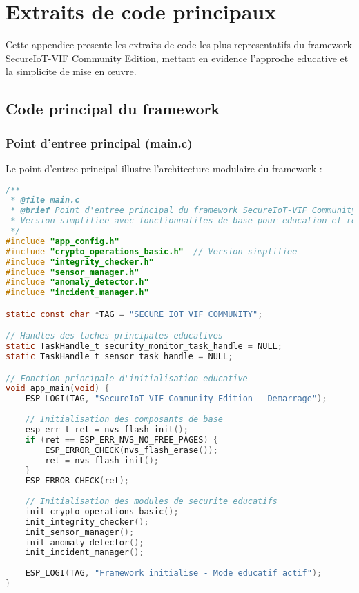 
\appendix

\chapter{Extraits de code principaux}
\label{app:code}

Cette appendice presente les extraits de code les plus representatifs du framework SecureIoT-VIF Community Edition, mettant en evidence l'approche educative et la simplicite de mise en œuvre.

\section{Code principal du framework}

\subsection{Point d'entree principal (main.c)}

Le point d'entree principal illustre l'architecture modulaire du framework :

\begin{lstlisting}[language=C, caption={Structure principale du framework - main.c}, label=lst:main-structure]
/**
 * @file main.c
 * @brief Point d'entree principal du framework SecureIoT-VIF Community Edition
 * Version simplifiee avec fonctionnalites de base pour education et recherche.
 */
#include "app_config.h"
#include "crypto_operations_basic.h"  // Version simplifiee
#include "integrity_checker.h"
#include "sensor_manager.h"
#include "anomaly_detector.h"
#include "incident_manager.h"

static const char *TAG = "SECURE_IOT_VIF_COMMUNITY";

// Handles des taches principales educatives
static TaskHandle_t security_monitor_task_handle = NULL;
static TaskHandle_t sensor_task_handle = NULL;

// Fonction principale d'initialisation educative
void app_main(void) {
    ESP_LOGI(TAG, "SecureIoT-VIF Community Edition - Demarrage");
    
    // Initialisation des composants de base
    esp_err_t ret = nvs_flash_init();
    if (ret == ESP_ERR_NVS_NO_FREE_PAGES) {
        ESP_ERROR_CHECK(nvs_flash_erase());
        ret = nvs_flash_init();
    }
    ESP_ERROR_CHECK(ret);
    
    // Initialisation des modules de securite educatifs
    init_crypto_operations_basic();
    init_integrity_checker();
    init_sensor_manager();
    init_anomaly_detector();
    init_incident_manager();
    
    ESP_LOGI(TAG, "Framework initialise - Mode educatif actif");
}
\end{lstlisting}

